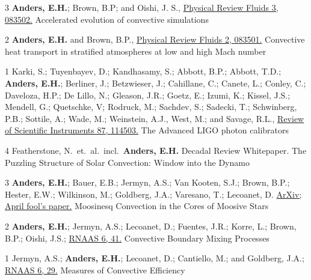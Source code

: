 	  {3}
	  {
		  \textbf{Anders, E.H.}; Brown, B.P; and Oishi, J. S.,
		  \href{https://journals.aps.org/prfluids/abstract/10.1103/PhysRevFluids.3.083502}{Physical Review Fluids 3, 083502.}
	  }
	  {Accelerated evolution of convective simulations}

	  {2}
	  {
		  \textbf{Anders, E.H.} and Brown, B.P.,
		  \href{https://journals.aps.org/prfluids/abstract/10.1103/PhysRevFluids.2.083501}{Physical Review Fluids 2, 083501.}
	  }
	  {Convective heat transport in stratified atmospheres at low and high Mach number}

	  {1}
	  {
			Karki, S.; Tuyenbayev, D.; Kandhasamy, S.; Abbott, B.P.; Abbott, T.D.; \textbf{Anders, E.H.};
			Berliner, J.; Betzwieser, J.; Cahillane, C.; Canete, L.; Conley, C.; Daveloza, H.P.; De Lillo, N.;
			Gleason, J.R.; Goetz, E.; Izumi, K.; Kissel, J.S.; Mendell, G.; Quetschke, V; Rodruck, M.; Sachdev, S.;
			Sadecki, T.; Schwinberg, P.B.; Sottile, A.; Wade, M.; Weinstein, A.J., West, M.; and Savage, R.L.,
			\href{https://aip.scitation.org/doi/10.1063/1.4967303}{Review of Scientific Instruments 87, 114503.}
	  }
	  {The Advanced LIGO photon calibrators}

\vspace{0.3cm}
	  {4}
	  {
		Featherstone, N.~et.~al.~incl.~\textbf{Anders, E.H.}
        Decadal Review Whitepaper. 
	  }
	  {
            The Puzzling Structure of Solar Convection: Window into the Dynamo
      }


\cvpub{}
	  {3}
	  {
		\textbf{Anders, E.H.}; Bauer, E.B.; Jermyn, A.S.; Van Kooten, S.J.; Brown, B.P.; Hester, E.W.; Wilkinson, M.; Goldberg, J.A.; Varesano, T.; Lecoanet, D.
        \href{https://arxiv.org/abs/2204.00002}{ArXiv; April fool's paper.}
	  }
	  {Moosinesq Convection in the Cores of Moosive Stars}

\cvpub{}
	  {2}
	  {
		\textbf{Anders, E.H.}; Jermyn, A.S.; Lecoanet, D.; Fuentes, J.R.; Korre, L.; Brown, B.P.; Oishi, J.S.; 
        \href{https://iopscience.iop.org/article/10.3847/2515-5172/ac5892}{RNAAS 6, 41.}
	  }
	  {Convective Boundary Mixing Processes}

\cvpub{}
	  {1}
	  {
		Jermyn, A.S.; \textbf{Anders, E.H.}; Lecoanet, D.; Cantiello, M.; and Goldberg, J.A.; 
        \href{https://iopscience.iop.org/article/10.3847/2515-5172/ac531e}{RNAAS 6, 29.}
	  }
	  {Measures of Convective Efficiency}


